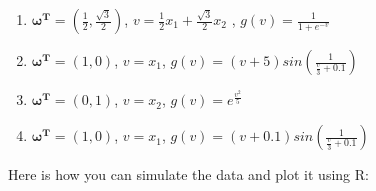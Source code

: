 \documentclass[12pt,]{krantz}
\begin{document}
\begin{enumerate}
\def\labelenumi{\arabic{enumi}.}
\item
  \(\mathbf{\omega^{T}}=(\frac{1}{2},\frac{\sqrt{3}}{2})\), \(v=\frac{1}{2}x_{1}+\frac{\sqrt{3}}{2}x_{2}\) , \(g(v)=\frac{1}{1+e^{-v}}\)
\item
  \(\mathbf{\omega^{T}}=(1,0)\), \(v = x_1\), \(g(v)=(v+5)sin(\frac{1}{\frac{v}{3}+0.1})\)
\item
  \(\mathbf{\omega^{T}}=(0,1)\), \(v = x_2\), \(g(v)=e^{\frac{v^2}{5}}\)
\item
  \(\mathbf{\omega^{T}}=(1,0)\), \(v = x_1\), \(g(v)=(v+0.1)sin(\frac{1}{\frac{v}{3}+0.1})\)
\end{enumerate}

Here is how you can simulate the data and plot it using R:
\end{document}
